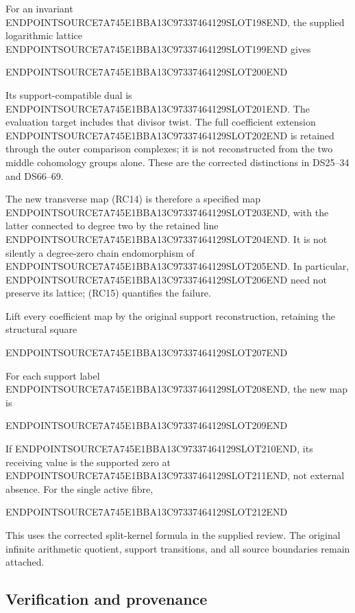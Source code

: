 For an invariant ENDPOINTSOURCE7A745E1BBA13C97337464129SLOT198END, the supplied logarithmic lattice ENDPOINTSOURCE7A745E1BBA13C97337464129SLOT199END gives

ENDPOINTSOURCE7A745E1BBA13C97337464129SLOT200END

Its support-compatible dual is ENDPOINTSOURCE7A745E1BBA13C97337464129SLOT201END. The evaluation target includes that divisor twist. The full coefficient extension ENDPOINTSOURCE7A745E1BBA13C97337464129SLOT202END is retained through the outer comparison complexes; it is not reconstructed from the two middle cohomology groups alone. These are the corrected distinctions in DS25--34 and DS66--69.

The new transverse map (RC14) is therefore a specified map ENDPOINTSOURCE7A745E1BBA13C97337464129SLOT203END, with the latter connected to degree two by the retained line ENDPOINTSOURCE7A745E1BBA13C97337464129SLOT204END. It is not silently a degree-zero chain endomorphism of ENDPOINTSOURCE7A745E1BBA13C97337464129SLOT205END. In particular, ENDPOINTSOURCE7A745E1BBA13C97337464129SLOT206END need not preserve its lattice; (RC15) quantifies the failure.

Lift every coefficient map by the original support reconstruction, retaining the structural square

ENDPOINTSOURCE7A745E1BBA13C97337464129SLOT207END

For each support label ENDPOINTSOURCE7A745E1BBA13C97337464129SLOT208END, the new map is

ENDPOINTSOURCE7A745E1BBA13C97337464129SLOT209END

If ENDPOINTSOURCE7A745E1BBA13C97337464129SLOT210END, its receiving value is the supported zero at ENDPOINTSOURCE7A745E1BBA13C97337464129SLOT211END, not external absence. For the single active fibre,

ENDPOINTSOURCE7A745E1BBA13C97337464129SLOT212END

This uses the corrected split-kernel formula in the supplied review. The original infinite arithmetic quotient, support transitions, and all source boundaries remain attached.

\subsection{Verification and provenance}\label{endpoint-residue_original--verification-and-provenance}

